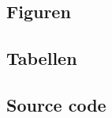 \documentclass[letterpaper, 12pt]{article}
\begin{document}
\parindent 0pt
\parskip 6pt



\clearpage
\tableofcontents
\clearpage



 
\clearpage
{}
\pagestyle{fancy}



\clearpage
\begingroup
\renewcommand{\section}[2]{}


\endgroup

\clearpage
\begin{appendices}
	\subsection{Figuren}
		\makeatletter
		\makeatother
	\subsection{Tabellen}
		\makeatletter
		\makeatother
	\subsection{Source code}
		\makeatletter
		\makeatother
\end{appendices}
\end{document}
